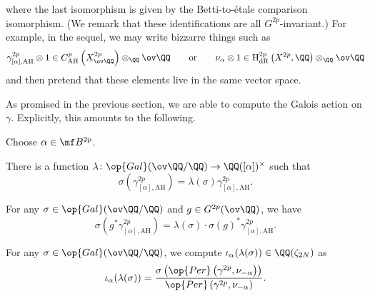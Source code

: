 \documentclass[../thesis.tex]{subfiles}
\begin{document}
where the last isomorphism is given by the Betti-to-\'etale comparison isomorphism. (We remark that these identifications are all $G^{2p}$-invariant.) For example, in the sequel, we may write bizzarre things such as
\[\gamma^{2p}_{[\alpha],\mathrm{AH}}\otimes1\in C^p_{\mathrm{AH}}\left(X^{2p}_{\ov\QQ}\right)\otimes_\QQ\ov\QQ\qquad\text{or}\qquad\nu_\alpha\otimes1\in\mathrm H^{2p}_{\mathrm{dR}}\left(X^{2p},\QQ\right)\otimes_\QQ\ov\QQ\]
and then pretend that these elements live in the same vector space.

As promised in the previous section, we are able to compute the Galois action on $\gamma$. Explicitly, this amounts to the following.
\begin{lemma} \label{lem:fermat-galois-action-abs-hodge}
	Choose $\alpha\in\mf B^{2p}$.
	\begin{listalph}
		\item There is a function $\lambda\colon\op{Gal}(\ov\QQ/\QQ)\to\QQ([\alpha])^\times$ such that
		\[\sigma\left(\gamma_{[\alpha],\mathrm{AH}}^{2p}\right)=\lambda(\sigma)\gamma_{[\alpha],\mathrm{AH}}^{2p}.\]
		\item For any $\sigma\in\op{Gal}(\ov\QQ/\QQ)$ and $g\in G^{2p}(\ov\QQ)$, we have
		\[\sigma\left(g^*\gamma_{[\alpha],\mathrm{AH}}^{2p}\right)=\lambda(\sigma)\cdot\sigma(g)^*\gamma_{[\alpha],\mathrm{AH}}^{2p}.\]
		\item For any $\sigma\in\op{Gal}(\ov\QQ/\QQ)$, we compute $\iota_\alpha(\lambda(\sigma))\in\QQ(\zeta_{2N})$ as
		\[\iota_\alpha(\lambda(\sigma))=\frac{\sigma\left(\op{Per}\left(\gamma^{2p},\nu_{-\alpha}\right)\right)}{\op{Per}\left(\gamma^{2p},\nu_{-\alpha}\right)}.\]
	\end{listalph}
\end{lemma}
\end{document}
